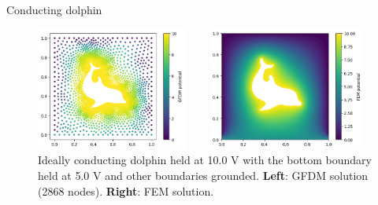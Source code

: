 \documentclass{beamer}
\begin{document}
\begin{frame}{Conducting dolphin}
\begin{figure}[h]
\begin{columns}
    \begin{column}{0.5\linewidth}
        \includegraphics[width=0.95\textwidth]{Figures/Dolfin_GFDM.png}
    \end{column}
    \begin{column}{0.5\linewidth}
        \includegraphics[width=0.95\textwidth]{Figures/Dolfin_FEM.png}
    \end{column}
\end{columns}
\caption{Ideally conducting dolphin held at 10.0 V with the bottom boundary held at 5.0 V and other boundaries grounded. \textbf{Left}: GFDM solution (2868 nodes). \textbf{Right}: FEM solution.}
\label{fig:dolfin}
\end{figure}
\end{frame}
\end{document}
